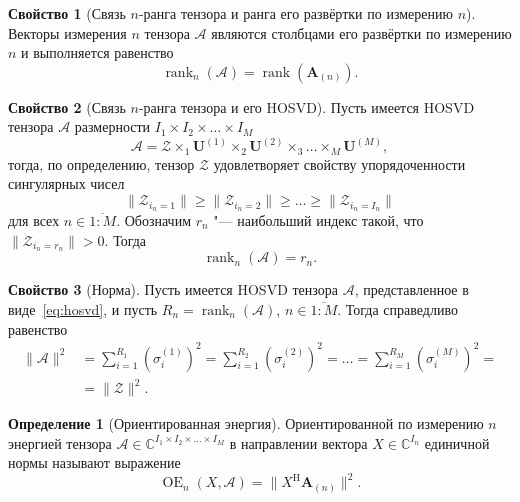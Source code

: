\documentclass[specialist,
    substylefile = spbu_report.rtx,
    subf,href,colorlinks=true, 12pt]{disser}
\theoremstyle{plain}
\theoremstyle{definition}
\newtheorem{definition}{Определение}[section]
\newtheorem{property}{Свойство}[section]
\theoremstyle{remark}
\begin{document}
    \begin{property}
    [Связь $n$-ранга тензора и ранга его развёртки по измерению $n$]
        Векторы измерения $n$ тензора $\mathcal{A}$ являются столбцами его развёртки по измерению $n$ и выполняется равенство
        \[\operatorname{rank}_{n}(\mathcal{A})=\operatorname{rank}(\mathbf{A}_{(n)}).\]
    \end{property}

    \begin{property}
    [Связь $n$-ранга тензора и его HOSVD]
        \label{property:n-rank}
        Пусть имеется HOSVD тензора $\mathcal{A}$ размерности $I_1\times I_2\times \ldots \times I_M$
        \[\mathcal{A} = \mathcal{Z}\times_1 \mathbf{U}^{(1)}\times_2\mathbf{U}^{(2)}\times_3\ldots \times_{M}\mathbf{U}^{(M)},\]
        тогда, по определению, тензор $\mathcal{Z}$ удовлетворяет свойству упорядоченности сингулярных чисел
        \[\|\mathcal{Z}_{i_n=1}\|\geqslant\|\mathcal{Z}_{i_n=2}\|\geqslant\ldots \geqslant \|\mathcal{Z}_{i_n=I_n}\|\]
        для всех $n\in \overline{1:M}$.
        Обозначим $r_n$ "--- наибольший индекс такой, что $\|\mathcal{Z}_{i_n=r_n}\|>0$.
        Тогда
        \begin{equation}
            \operatorname{rank}_n(\mathcal{A})=r_n.\label{eq:n-rank}
        \end{equation}
    \end{property}

    \begin{property}[Норма]
        \label{property:norm}
        Пусть имеется HOSVD тензора $\mathcal{A}$, представленное в виде~\eqref{eq:hosvd}, и пусть $R_n=\operatorname{rank}_n(\mathcal{A})$,
        $n\in \overline{1:M}$.
        Тогда справедливо равенство
        \begin{align*}
            \|\mathcal{A}\|^2&=\sum_{i=1}^{R_1}\left( \sigma_i^{(1)} \right)^2=\sum_{i=1}^{R_2}\left( \sigma_i^{(2)} \right)^2
            =\ldots =\sum_{i=1}^{R_M}\left( \sigma_i^{(M)} \right)^2=\\
            &= \|\mathcal{Z}\|^2.
        \end{align*}
    \end{property}

    \begin{definition}[Ориентированная энергия]
        Ориентированной по измерению $n$ энергией тензора $\mathcal{A}\in \mathbb{C}^{I_1\times I_2\times \ldots \times I_M}$ в направлении
        вектора $X\in \mathbb{C}^{I_n}$ единичной нормы называют выражение
        \[
            \operatorname{OE}_n(X, \mathcal{A}) = \|X^{\mathrm{H}}\mathbf{A}_{(n)}\|^2.
        \]
    \end{definition}
\end{document}
